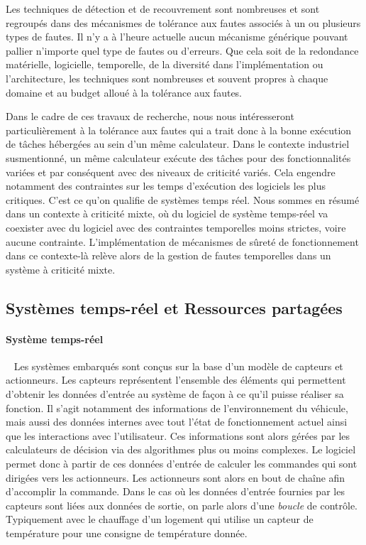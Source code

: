 \documentclass[french, a4paper, 11pt, twoside, pdftex]{StyleThese}
\begin{document}
		Les techniques de détection et de recouvrement sont nombreuses et sont regroupés dans des mécanismes de tolérance aux fautes associés à un ou plusieurs types de fautes. Il n’y a à l’heure actuelle aucun mécanisme générique pouvant pallier n’importe quel type de fautes ou d’erreurs. Que cela soit de la redondance matérielle, logicielle, temporelle, de la diversité dans l’implémentation ou l’architecture, les techniques sont nombreuses et souvent propres à chaque domaine et au budget alloué à la tolérance aux fautes.
		
		Dans le cadre de ces travaux de recherche, nous nous intéresseront particulièrement à la tolérance aux fautes qui a trait donc à la bonne exécution de tâches hébergées au sein d'un même calculateur. Dans le contexte industriel susmentionné, un même calculateur exécute des tâches pour des fonctionnalités variées et par conséquent avec des niveaux de criticité variés. Cela engendre notamment des contraintes sur les temps d'exécution des logiciels les plus critiques. C'est ce qu'on qualifie de systèmes temps réel. Nous sommes en résumé dans un contexte à criticité mixte, où du logiciel de système temps-réel va coexister avec du logiciel avec des contraintes temporelles moins strictes, voire aucune contrainte. L'implémentation de mécanismes de sûreté de fonctionnement dans ce contexte-là relève alors de la gestion de fautes temporelles dans un système à criticité mixte. 
		
\subsection{Systèmes temps-réel et Ressources partagées}
	\paragraph{Système temps-réel}~\label{sec:SystemesTempsReels}
	Les systèmes embarqués sont conçus sur la base d'un modèle de capteurs et actionneurs. Les capteurs représentent l'ensemble des éléments qui permettent d'obtenir les données d'entrée au système de façon à ce qu'il puisse réaliser sa fonction. Il s'agit notamment des informations de l'environnement du véhicule, mais aussi des données internes avec tout l'état de fonctionnement actuel ainsi que les interactions avec l'utilisateur. Ces informations sont alors gérées par les calculateurs de décision via des algorithmes plus ou moins complexes. Le logiciel permet donc à partir de ces données d'entrée de calculer les commandes qui sont dirigées vers les actionneurs. Les actionneurs sont alors en bout de chaîne afin d'accomplir la commande. Dans le cas où les données d'entrée fournies par les capteurs sont liées aux données de sortie, on parle alors d'une \emph{boucle} de contrôle. Typiquement avec le chauffage d'un logement qui utilise un capteur de température pour une consigne de température donnée.
		
\end{document}
